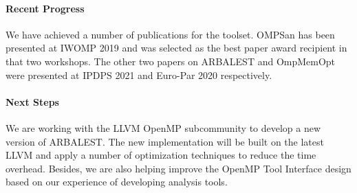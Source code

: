 \paragraph{Recent Progress}
We have achieved a number of publications for the toolset. OMPSan has been presented at IWOMP 2019 and was selected as the best paper award recipient in that two workshops. The other two papers on ARBALEST and OmpMemOpt were presented at IPDPS 2021 and Euro-Par 2020 respectively.

\paragraph{Next Steps}
We are working with the LLVM OpenMP subcommunity to develop a new version of ARBALEST. The new implementation will be built on the latest LLVM and apply a number of optimization techniques to reduce the time overhead. Besides, we are also helping improve the OpenMP Tool Interface design based on our experience of developing analysis tools.
